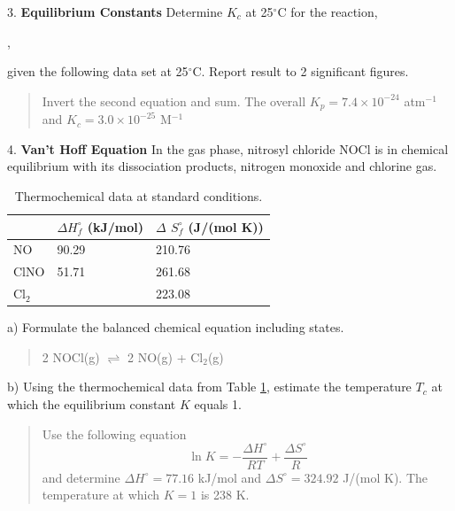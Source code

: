 \documentclass[11pt]{article}
\newcommand{\brian}[1]{
  {\begin{quote}
      \color{blue} #1
  \end{quote}}
}
\begin{document}
3. \textbf{Equilibrium Constants} Determine $K_c$ at 25$^\circ$C
for the reaction,
\begin{center}
  ,
\end{center}
given the following data set at 25$^\circ$C. Report result to 2 significant figures.
\begin{center}


\end{center}

\brian{Invert the second equation and sum. The overall $K_p = 7.4\times 10^{-24}$ atm$^{-1}$
  and $K_c = 3.0 \times 10^{-25}$ M$^{-1}$
  }

4. \textbf{Van't Hoff Equation} In the gas phase, nitrosyl chloride NOCl is in chemical
equilibrium with its dissociation products, nitrogen monoxide and chlorine gas.

\begin{table}[hbpt]
  \centering
  \begin{tabular}{lll}
      & $\Delta H^\circ_f$ (kJ/mol) & {\color{blue}$\Delta$} $S^\circ_f$ (J/(mol K)) \\
      \hline
      NO     & 90.29 & 210.76 \\
      ClNO   & 51.71 & 261.68 \\
      Cl$_2$ &       & 223.08
  \end{tabular}
  \caption{Thermochemical data at standard conditions.}
  \label{tab:therm}
\end{table}

a) Formulate the balanced chemical equation including states.

\brian{2 NOCl(g) $\rightleftharpoons$ 2 NO(g) + Cl$_2$(g)}

b) Using the thermochemical data from Table \ref{tab:therm}, estimate the temperature $T_c$
at which the equilibrium constant $K$ equals 1.

\brian{Use the following equation
  \begin{equation*}
      \ln K = -\frac{\Delta H^\circ}{RT} + \frac{\Delta S^\circ}{R}
  \end{equation*}
  and determine $\Delta H^\circ = 77.16$ kJ/mol and $\Delta S^\circ=324.92$ J/(mol K). The
  temperature at which $K=1$ is 238 K.
}
\end{document}
